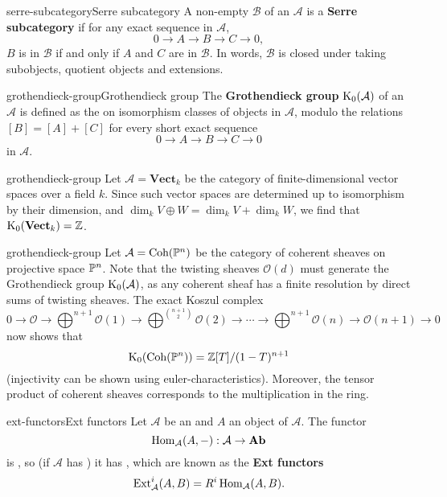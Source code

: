 \begin{topic}{serre-subcategory}{Serre subcategory}
    A non-empty  $\mathcal{B}$ of an  $\mathcal{A}$ is a \textbf{Serre subcategory} if for any exact sequence in $\mathcal{A}$,
    \[ 0 \to A \to B \to C \to 0 , \]
    $B$ is in $\mathcal{B}$ if and only if $A$ and $C$ are in $\mathcal{B}$. In words, $\mathcal{B}$ is closed under taking subobjects, quotient objects and extensions.
\end{topic}

\begin{topic}{grothendieck-group}{Grothendieck group}
    The \textbf{Grothendieck group} $\textup{K}_0(\mathcal{A})$ of an  $\mathcal{A}$ is defined as the  on isomorphism classes of objects in $\mathcal{A}$, modulo the relations $[B] = [A] + [C]$ for every short exact sequence
    \[ 0 \to A \to B \to C \to 0 \]
    in $\mathcal{A}$.
\end{topic}

\begin{example}{grothendieck-group}
    Let $\mathcal{A} = \textbf{Vect}_k$ be the category of finite-dimensional vector spaces over a field $k$. Since such vector spaces are determined up to isomorphism by their dimension, and $\dim_k V \oplus W = \dim_k V + \dim_k W$, we find that $\textup{K}_0(\textbf{Vect}_k) = \mathbb{Z}$.
\end{example}

\begin{example}{grothendieck-group}
    Let $\mathcal{A} = \textup{Coh}(\mathbb{P}^n)$ be the category of coherent sheaves on projective space $\mathbb{P}^n$. Note that the twisting sheaves $\mathcal{O}(d)$ must generate the Grothendieck group $\textup{K}_0(\mathcal{A})$, as any coherent sheaf has a finite resolution by direct sums of twisting sheaves. The exact Koszul complex
    \[ 0 \to \mathcal{O} \to \bigoplus^{n + 1} \mathcal{O}(1) \to \bigoplus^{\binom{n + 1}{2}} \mathcal{O}(2) \to \cdots \to \bigoplus^{n + 1} \mathcal{O}(n) \to \mathcal{O}(n + 1) \to 0 \]
    now shows that
    \[ \textup{K}_0(\textup{Coh}(\mathbb{P}^n)) = \mathbb{Z}[T] / (1 - T)^{n + 1} \]
    (injectivity can be shown using euler-characteristics). Moreover, the tensor product of coherent sheaves corresponds to the multiplication in the ring.
\end{example}

\begin{topic}{ext-functors}{Ext functors}
    Let $\mathcal{A}$ be an  and $A$ an object of $\mathcal{A}$. The functor
    \[ \operatorname{Hom}_{\mathcal{A}}(A, -) : \mathcal{A} \to \textbf{Ab} \]
    is , so (if $\mathcal{A}$ has ) it has , which are known as the \textbf{Ext functors}
    \[ \textup{Ext}^i_\mathcal{A}(A, B) = R^i \operatorname{Hom}_\mathcal{A}(A, B) . \]
\end{topic}

